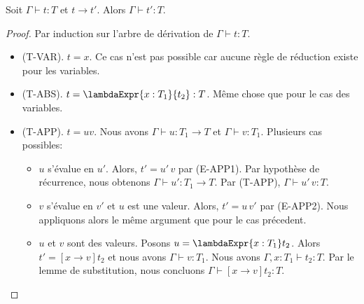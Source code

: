 \begin{theorem} 
  \label{thm:simply-typed-lambda-calculus-preservation}
  Soit $\Gamma \vdash t : T$ et $t \rightarrow t'$. Alors $\Gamma \vdash t' :
  T$.
\end{theorem}

\begin{proof}
  \label{proof:simply-typed-lambda-calculus-preservation}
  Par induction sur l'arbre de dérivation de $\Gamma \vdash t : T$.
  \begin{itemize}
  \item (T-VAR). $t = x$. Ce cas n'est pas possible car aucune règle de
    réduction existe pour les variables.
  \item (T-ABS). $t = \lambdaExpr{x : T_{1}}{t_{2}} : T$. Même chose que pour le
    cas des variables.
  \item (T-APP). $t = u v$. Nous avons $\Gamma
    \vdash u : T_{1} \rightarrow T$ et $\Gamma \vdash v : T_{1}$. Plusieurs cas possibles:
    \begin{itemize}
    \item $u$ s'évalue en $u'$. Alors, $t' = u' \, v$ par (E-APP1). Par hypothèse
      de récurrence, nous
      obtenons $\Gamma \vdash u' : T_{1} \rightarrow T$. Par (T-APP),
      $\Gamma \vdash u' \, v : T$.
    \item $v$ s'évalue en $v'$ et $u$ est une valeur. Alors, $t' = u \, v'$ par
      (E-APP2). Nous appliquons alors le même argument que pour le cas précedent.
    \item $u$ et $v$ sont des valeurs. Posons $u = \lambdaExpr{x : T_{1}} t_{2}$.
      Alors $t' = [x \rightarrow v]t_{2}$ et nous avons $\Gamma \vdash v :
      T_{1}$. Nous avons $\Gamma, x : T_{1} \vdash t_{2}
      : T$. Par le lemme de
      substitution, nous concluons $\Gamma \vdash [x \rightarrow v]t_{2} : T$.
    \end{itemize}
  \end{itemize}
\end{proof}